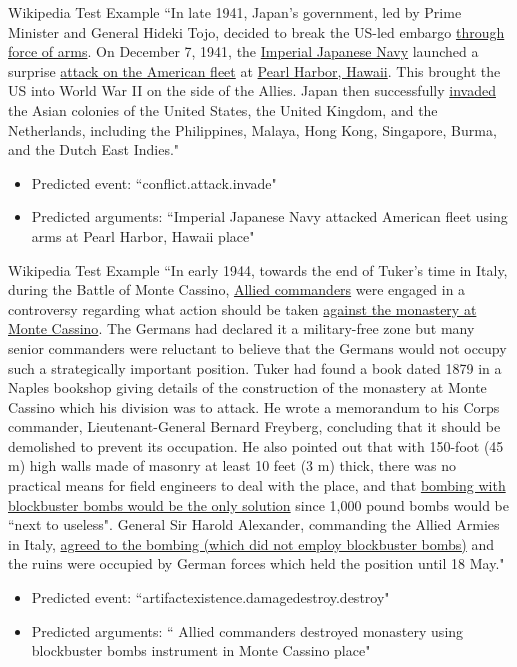 \documentclass[10pt,aspectratio=1610,professionalfont]{beamer}
\begin{document}
\begin{frame}{Wikipedia Test Example}
    “In late 1941, Japan's government, led by Prime Minister and General Hideki Tojo, decided to break the US-led embargo \underline{through force of arms}. On December 7, 1941, the \underline{Imperial Japanese Navy} launched a surprise \underline{attack on the American fleet} at \underline{Pearl Harbor, Hawaii}. This brought the US into World War II on the side of the Allies. Japan then successfully \underline{invaded} the Asian colonies of the United States, the United Kingdom, and the Netherlands, including the Philippines, Malaya, Hong Kong, Singapore, Burma, and the Dutch East Indies."
    \begin{itemize}
        \item Predicted event: “conflict.attack.invade"
        \item Predicted arguments: “Imperial Japanese Navy attacked American fleet using arms at Pearl Harbor, Hawaii place"
    \end{itemize}
\end{frame}

\begin{frame}{Wikipedia Test Example}
    “In early 1944, towards the end of Tuker's time in Italy, during the Battle of Monte Cassino, \underline{Allied commanders} were engaged in a controversy regarding what action should be taken \underline{against the monastery at Monte Cassino}. The Germans had declared it a military-free zone but many senior commanders were reluctant to believe that the Germans would not occupy such a strategically important position. Tuker had found a book dated 1879 in a Naples bookshop giving details of the construction of the monastery at Monte Cassino which his division was to attack. He wrote a memorandum to his Corps commander, Lieutenant-General Bernard Freyberg, concluding that it should be demolished to prevent its occupation. He also pointed out that with 150-foot (45 m) high walls made of masonry at least 10 feet (3 m) thick, there was no practical means for field engineers to deal with the place, and that \underline{bombing with blockbuster bombs would be the only solution} since 1,000 pound bombs would be “next to useless". General Sir Harold Alexander, commanding the Allied Armies in Italy, \underline{agreed to the bombing (which did not employ blockbuster bombs)} and the ruins were occupied by German forces which held the position until 18 May."
    \begin{itemize}
        \item Predicted event: “artifactexistence.damagedestroy.destroy"
        \item Predicted arguments: “ Allied commanders destroyed monastery using blockbuster bombs instrument in Monte Cassino place"
    \end{itemize}
\end{frame}
\end{document}
